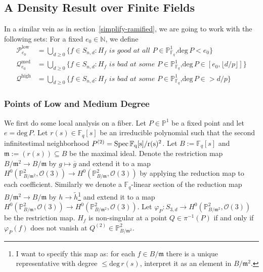 \documentclass[12pt]{article}
\theoremstyle{plain}
\theoremstyle{definition}
\newcommand{\fm}{\mathfrak{m}}
\newcommand{\IN}{\mathbb{N}}
\newcommand{\IF}{\mathbb{F}}
\newcommand{\IP}{\mathbb{P}}
\newcommand{\sO}{\mathcal{O}}
\newcommand{\sP}{\mathcal{P}}
\newcommand{\sQ}{\mathcal{Q}}
\renewcommand{\deg}{\mathrm{deg}\,}
\newcommand{\Spec}{\rm Spec\,}
\newcommand\union{\bigcup}
\newcommand{\<}{\langle}
\renewcommand{\>}{\rangle}
\def\wt{\widetilde}
\begin{document}
\subsection{A Density Result over Finite Fields}
In a similar vein as in section~\ref{simplify-ramified}, we are going to work with the following sets:
For a fixed $e_0 \in \IN$, we define 
\begin{align*}
\sP_{e_0}^{\mathrm{low}} &= \union_{d \ge 0} \{ f \in S_{n, d} : H_f \textit{ is good at all $P \in \IP^1_{\IF_q}$,}\deg P < e_0\}\\
\sQ_{e_0}^{\mathrm{med}} &= \union_{d \ge 0} \{f \in S_{n, d} : H_f \textit{ is bad at some $P \in \IP^1_{\IF_q}$,}\deg P \in [e_0, \lfloor d/p \rfloor]\}\\
\sQ^{\mathrm{high}} &= \union_{d \ge 0} \{f \in S_{n, d} : H_f \textit{ is bad at some $P \in \IP^1_{\IF_q}$,}\deg P \in > d/p\}
\end{align*}
\subsubsection{Points of Low and Medium Degree}
 

We first do some local analysis on a fiber. Let $P \in \IP^1$ be a fixed point and let $e = \deg P$. Let $r(s) \in \IF_q[s]$ be an irreducible polynomial such that the second infinitestimal neighborhood $P^{(2)} = \Spec \IF_q[s]/r(s)^2$. Let $B := \IF_q[s]$ and $\fm := (r(s)) \subseteq B$ be the maximal ideal. Denote the restriction map $B/\fm^2 \to B/\fm$ by $g \mapsto \overline{g}$ and extend it to a map $H^0(\IP^2_{B/\fm^2}, \sO(3)) \to H^0(\IP^2_{B/\fm}, \sO(3))$ by applying the reduction map to each coefficient. Similarly we denote a $\IF_q$-linear section of the reduction map $B/\fm^2 \to B/\fm$ by $h \to \wt{h}$\footnote{I want to specify this map as: for each $f \in B/\fm$ there is a unique representative with degree $\le \deg r(s)$, interpret it as an element in $B/\fm^2$.} and extend it to a map $H^0(\IP^2_{B/\fm}, \sO(3)) \to H^0(\IP^2_{B/\fm^2}, \sO(3))$. Let $\varphi_P : S_{3, d} \to H^0(\IP^2_{B/\fm^2}, \sO(3))$ be the restriction map. $H_f$ is non-singular at a point $Q \in \pi^{-1}(P)$ if and only if $\varphi_P(f)$ does not vanish at $Q^{(2)} \in \IP^2_{B/\fm^2}$. 
\end{document}
